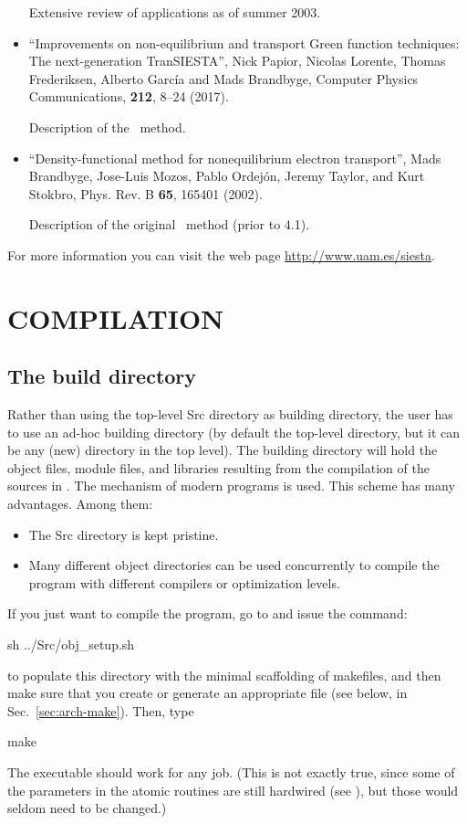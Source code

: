 \begin{itemize}
Extensive review of applications as of summer 2003.

\item
 ``Improvements on non-equilibrium and transport Green function techniques: The next-generation TranSIESTA'',
 Nick Papior, Nicolas Lorente, Thomas Frederiksen, Alberto García and
 Mads Brandbyge, Computer Physics Communications, \textbf{212}, 8--24 (2017).

 Description of the \tsiesta\ method.

\item
 ``Density-functional method for nonequilibrium electron transport'',
 Mads Brandbyge, Jose-Luis Mozos, Pablo Ordej\'on, Jeremy Taylor,
 and Kurt Stokbro, Phys. Rev. B \textbf{65}, 165401 (2002).

 Description of the original \tsiesta\ method (prior to 4.1).

\end{itemize}

For more information you can visit the web page
\url{http://www.uam.es/siesta}.

\section{COMPILATION}
\label{sec:compilation}

\subsection{The build directory}

Rather than using the top-level Src directory as building directory,
the user has to use an ad-hoc building directory (by default the
top-level  directory, but it can be any (new) directory in
the top level).  The building directory will hold the object files,
module files, and libraries resulting from the compilation of the
sources in .  The  mechanism of modern 
programs is used. This scheme has many advantages. Among them:

\begin{itemize}
\item The Src directory is kept pristine.
\item Many different object directories can be used concurrently to
  compile the program with different compilers or optimization levels.
\end{itemize}

If you just want to compile the program, go to  and issue the
command:
\begin{shellexample}
  sh ../Src/obj_setup.sh
\end{shellexample}
to populate this directory with the minimal scaffolding of makefiles,
and then make sure that you create or generate an appropriate 
file (see below, in Sec.~\ref{sec:arch-make}). Then, type
\begin{shellexample}
  make
\end{shellexample}
The executable should work for any job. (This is not exactly true,
since some of the parameters in the atomic routines are still
hardwired (see ), but those would seldom need to
be changed.)

